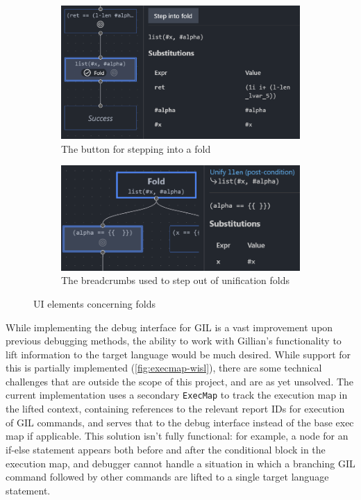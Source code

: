 \begin{figure}
  \centering
  \begin{subfigure}[b]{0.45\textwidth}
    \centering
    \includegraphics[width=\textwidth]{img/unifymap-fold-button.png}
    \caption{The button for stepping into a fold}%
    \label{fig:unifymap-fold-button}
  \end{subfigure}
  \quad
  \begin{subfigure}[b]{0.45\textwidth}
    \centering
    \includegraphics[width=\textwidth]{img/unifymap-breadcrumbs.png}
    \caption{The breadcrumbs used to step out of unification folds}%
    \label{fig:unifymap-breadcrumbs}
  \end{subfigure}
  \caption{UI elements concerning folds}
\end{figure}

While implementing the debug interface for GIL is a vast improvement upon
previous debugging methods, the ability to work with Gillian's functionality
to lift information to the target language would be much desired. While support
for this is partially implemented (\autoref{fig:execmap-wisl}), there are some
technical challenges that are outside the scope of this project, and are as yet
unsolved. The current implementation uses a secondary \texttt{ExecMap} to track
the execution map in the lifted context, containing references to the relevant
report IDs for execution of GIL commands, and serves that to the debug interface
instead of the base exec map if applicable. This solution isn't fully
functional: for example, a node for an if-else statement appears both before
and after the conditional block in the execution map, and debugger cannot
handle a situation in which a branching GIL command followed by other commands
are lifted to a single target language statement.

